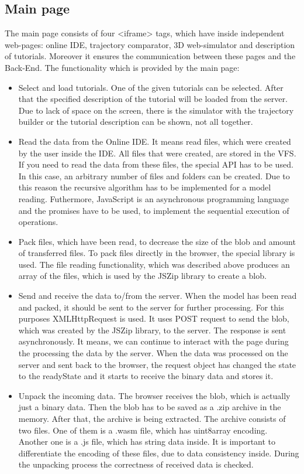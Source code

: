 \subsection{Main page}
The main page consists of four <iframe> tags, which have inside independent web-pages: online IDE, trajectory comparator, 3D web-simulator and description of tutorials. Moreover it ensures the communication between these pages and the Back-End. The functionality which is provided by the main page:
\begin{itemize}
    \item Select and load tutorials. One of the given tutorials can be selected. After that the specified description of the tutorial will be loaded from the server. Due to lack of space on the screen, there is the simulator with the trajectory builder or the tutorial description can be shown, not all together.
    \item Read the data from the Online IDE. It means read files, which were created by the user inside the IDE. All files that were created, are stored in the VFS. If you need to read the data from these files, the special API\cite{FilesystemAPI} has to be used. In this case, an arbitrary number of files and folders can be created. Due to this reason the recursive algorithm has to be implemented for a model reading. Futhermore, JavaScript is an asynchronous programming language and the promises\cite{JSPromise} have to be used, to implement the sequential execution of operations.
    \item Pack files, which have been read, to decrease the size of the blob and amount of transferred files. To pack files directly in the browser, the special library is used. The file reading functionality, which was described above produces an array of the files, which is used by the JSZip library\cite{JSZip} to create a blob.
    \item Send and receive the data to/from the server. When the model has been read and packed, it should be sent to the server for further processing. For this purposes XMLHttpRequest \cite{XMLHttpRequest} is used. It uses POST request to send the blob, which was created by the JSZip library, to the server. The response is sent asynchronously. It means, we can continue to interact with the page during the processing the data by the server. When the data was processed on the server and sent back to the browser, the request object has changed the state to the readyState and it starts to receive the binary data and stores it.
    \item Unpack the incoming data. The browser receives the blob, which is actually just a binary data. Then the blob has to be saved as a .zip archive in the memory. After that, the archive is being extracted. The archive consists of two files. One of them is a .wasm file, which has uint8array encoding. Another one is a .js file, which has string data inside. It is important to differentiate the encoding of these files, due to data consistency inside. During the unpacking process the correctness of received data is checked.

\end{itemize}

